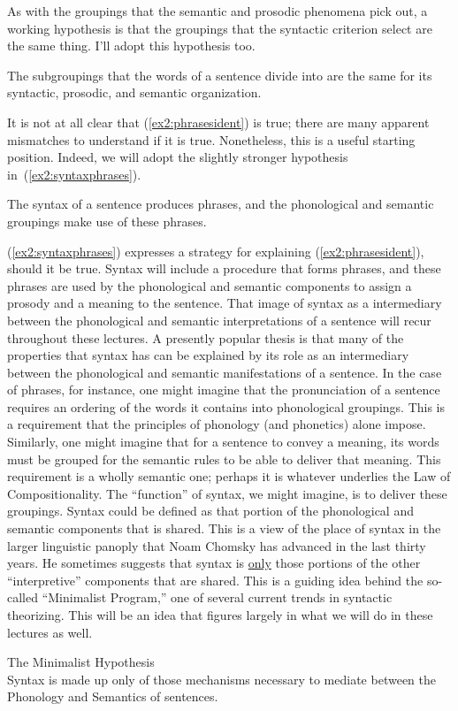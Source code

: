 As with the groupings that the semantic and prosodic phenomena pick out, a working hypothesis is that the groupings that the syntactic criterion select are the same thing. I'll adopt this hypothesis too.
\begin{exe}
	\ex \label{ex2:phrasesident} The subgroupings that the words of a sentence divide into are the same for its syntactic, prosodic, and semantic organization.
\end{exe}
It is not at all clear that (\ref{ex2:phrasesident}) is true; there are many apparent mismatches to understand if it is true. %
%
%
%
Nonetheless, this is a useful starting position. Indeed, we will adopt the slightly stronger hypothesis in~(\ref{ex2:syntaxphrases}).
\begin{exe}
	\ex \label{ex2:syntaxphrases} The syntax of a sentence produces phrases, and the phonological and semantic groupings make use of these phrases.
\end{exe}
(\ref{ex2:syntaxphrases}) expresses a strategy for explaining (\ref{ex2:phrasesident}), should it be true. Syntax will include a procedure that forms phrases, and these phrases are used by the phonological and semantic components to assign a prosody and a meaning to the sentence. That image of syntax as a intermediary between the phonological and semantic interpretations of a sentence will recur throughout these lectures. A presently popular thesis is that many of the properties that syntax has can be explained by its role as an intermediary between the phonological and semantic manifestations of a sentence. In the case of phrases, for instance, one might imagine that the pronunciation of a sentence requires an ordering of the words it contains into phonological groupings. This is a requirement that the principles of phonology (and phonetics) alone impose. Similarly, one might imagine that for a sentence to convey a meaning, its words must be grouped for the semantic rules to be able to deliver that meaning. This requirement is a wholly semantic one; perhaps it is whatever underlies the Law of Compositionality. The ``function'' of syntax, we might imagine, is to deliver these groupings. Syntax could be defined as that portion of the phonological and semantic components that is shared. This is a view of the place of syntax in the larger linguistic panoply that Noam Chomsky has advanced in the last thirty years. He sometimes suggests that syntax is \underline{only} those portions of the other ``interpretive'' components that are shared. This is a guiding idea behind the so-called ``Minimalist Program,'' one of several current trends in syntactic theorizing.\cite{Chomsky:1995} This will be an idea that figures largely in what we will do in these lectures as well.
\pagebreak
\begin{exe}
	\ex \label{ex2:themininmalist} The Minimalist Hypothesis\\
	Syntax is made up only of those mechanisms necessary to mediate between the Phonology and Semantics of sentences.
\end{exe}

